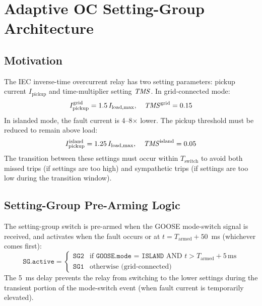 \section{Adaptive OC Setting-Group Architecture}
\label{sec:ch6_adaptiveoc}

\subsection{Motivation}

The IEC inverse-time overcurrent relay has two setting parameters:
pickup current $I_\mathrm{pickup}$ and time-multiplier setting $\mathit{TMS}$.
In grid-connected mode:
\begin{equation}
  I_\mathrm{pickup}^\mathrm{grid} = 1.5\,I_\mathrm{load,max}, \quad
  \mathit{TMS}^\mathrm{grid} = 0.15
  \label{eq:ch6_sg_settings}
\end{equation}
In islanded mode, the fault current is 4--8$\times$ lower. The pickup
threshold must be reduced to remain above load:
\begin{equation}
  I_\mathrm{pickup}^\mathrm{island} = 1.25\,I_\mathrm{load,max}, \quad
  \mathit{TMS}^\mathrm{island} = 0.05
  \label{eq:ch6_island_settings}
\end{equation}
The transition between these settings must occur within $T_\mathrm{switch}$
to avoid both missed trips (if settings are too high) and sympathetic
trips (if settings are too low during the transition window).

\subsection{Setting-Group Pre-Arming Logic}

The setting-group switch is pre-armed when the GOOSE mode-switch signal
is received, and activates when the fault occurs or at
$t = T_\mathrm{armed} + 50$~ms (whichever comes first):
\begin{equation}
  \texttt{SG.active} = \begin{cases}
    \texttt{SG2} & \text{if } \texttt{GOOSE.mode = ISLAND} \text{ AND } t > T_\mathrm{armed} + 5\,\mathrm{ms} \\
    \texttt{SG1} & \text{otherwise (grid-connected)}
  \end{cases}
  \label{eq:ch6_sg_logic}
\end{equation}
The 5~ms delay prevents the relay from switching to the lower settings
during the transient portion of the mode-switch event (when fault current
is temporarily elevated).

